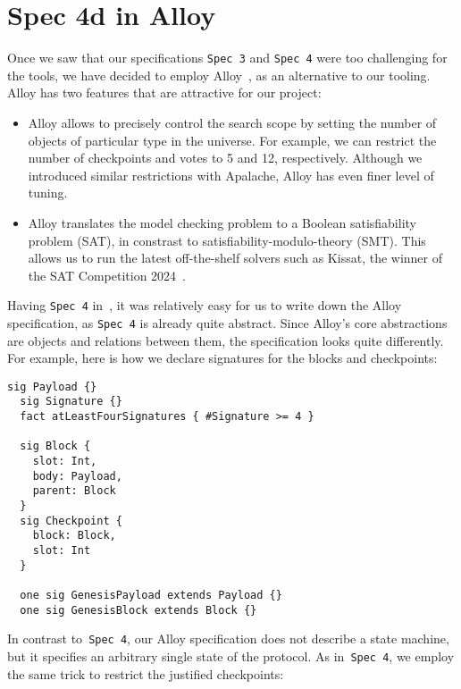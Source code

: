 
\section{Spec 4d in Alloy}

Once we saw that our specifications \texttt{Spec 3} and \texttt{Spec 4}
were too challenging for the \tlap{} tools, we have decided to employ
Alloy~\cite{jackson2012software,alloytools}, as an alternative to our tooling.
Alloy has two features that are attractive for our project:

\begin{itemize}

  \item Alloy allows to precisely control the search scope by setting the
      number of objects of particular type in the universe. For example, we can
      restrict the number of checkpoints and votes to 5 and 12, respectively.
      Although we introduced similar restrictions with Apalache, Alloy has even
      finer level of tuning.

  \item Alloy translates the model checking problem to a Boolean satisfiability
      problem (SAT), in constrast to satisfiability-modulo-theory (SMT).  This
      allows us to run the latest off-the-shelf solvers such as Kissat, the
      winner of the SAT Competition 2024~\cite{SAT-Competition-2024-solvers}.

\end{itemize}

Having \texttt{Spec 4} in~\tlap{}, it was relatively easy for us to write down
the Alloy specification, as \texttt{Spec 4} is already quite abstract. Since
Alloy's core abstractions are objects and relations between them, the
specification looks quite differently. For example, here is how we declare
signatures for the blocks and checkpoints:

\begin{lstlisting}[language=alloy,columns=fullflexible]
  sig Payload {}
  sig Signature {}
  fact atLeastFourSignatures { #Signature >= 4 }

  sig Block {
    slot: Int,
    body: Payload,
    parent: Block
  }
  sig Checkpoint {
    block: Block,
    slot: Int
  }

  one sig GenesisPayload extends Payload {}
  one sig GenesisBlock extends Block {}
\end{lstlisting}

In contrast to~\texttt{Spec 4}, our Alloy specification does not describe a
state machine, but it specifies an arbitrary single state of the protocol. As
in~\texttt{Spec 4}, we employ the same trick to restrict the justified
checkpoints:

